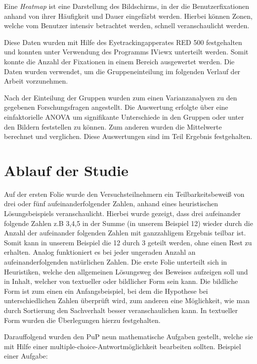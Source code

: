 Eine \textit{Heatmap} ist eine Darstellung des Bildschirms, in der die Benutzerfixationen anhand von ihrer Häufigkeit und Dauer eingefärbt werden. Hierbei können Zonen, welche vom Benutzer intensiv betrachtet werden, schnell veranschaulicht werden.

Diese Daten wurden mit Hilfe des Eyetrackingapperates RED 500 festgehalten und konnten unter Verwendung des Programms IViewx unterteilt werden. Somit konnte die Anzahl der Fixationen in einem Bereich ausgewertet werden. Die Daten wurden verwendet, um die Gruppeneinteilung im folgenden Verlauf der Arbeit vorzunehmen.

Nach der Einteilung der Gruppen wurden zum einen Varianzanalysen zu den gegebenen Forschungsfragen angestellt. Die Auswertung erfolgte über eine einfaktorielle ANOVA um signifikante Unterschiede in den Gruppen oder unter den Bildern feststellen zu können. Zum anderen wurden die Mittelwerte berechnet und verglichen. Diese Auswertungen sind im Teil Ergebnis festgehalten.

\section{Ablauf der Studie}

Auf der ersten Folie wurde den Versuchsteilnehmern ein Teilbarkeitsbeweiß von drei oder fünf aufeinanderfolgender Zahlen, anhand eines heuristischen Lösungsbeispiels veranschaulicht. Hierbei wurde gezeigt, dass drei aufeinander folgende Zahlen z.B 3,4,5 in der Summe (in unserem Beispiel 12) wieder durch die Anzahl der aufeinander folgenden Zahlen mit ganzzahligem Ergebnis teilbar ist. Somit kann in unserem Beispiel die 12 durch 3 geteilt werden, ohne einen Rest zu erhalten.
Analog funktioniert es bei jeder ungeraden Anzahl an aufeinanderfolgenden natürlichen Zahlen. Die erste Folie unterteilt sich in Heuristiken, welche den allgemeinen Lösungsweg des Beweises aufzeigen soll und in Inhalt, welcher von textueller oder bildlicher Form sein kann. Die bildliche Form ist zum einen ein Anfangsbeispiel, bei dem die Hypothese bei unterschiedlichen Zahlen überprüft wird, zum anderen eine Möglichkeit, wie man durch Sortierung den Sachverhalt besser veranschaulichen kann. In textueller Form wurden die Überlegungen hierzu festgehalten.

Darauffolgend wurden den \gls{PuP} neun mathematische Aufgaben gestellt, welche sie mit Hilfe einer multiple-choice-Antwortmöglichkeit bearbeiten sollten. Beispiel einer Aufgabe:


